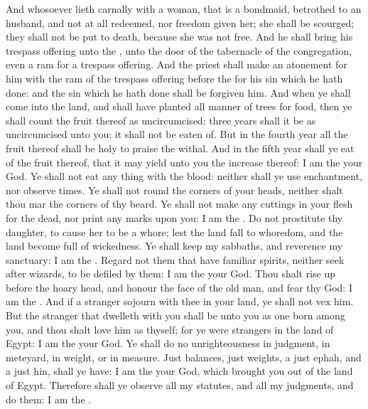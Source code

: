 \begin{biblechapter}
\verse And whosoever lieth carnally with a woman, that is a bondmaid, betrothed to an husband, and not at all redeemed, nor freedom given her; she shall be scourged; they shall not be put to death, because she was not free.
\verse And he shall bring his trespass offering unto the \LORD, unto the door of the tabernacle of the congregation, even a ram for a trespass offering.
\verse And the priest shall make an atonement for him with the ram of the trespass offering before the \LORD for his sin which he hath done: and the sin which he hath done shall be forgiven him.
\verse And when ye shall come into the land, and shall have planted all manner of trees for food, then ye shall count the fruit thereof as uncircumcised: three years shall it be as uncircumcised unto you: it shall not be eaten of.
\verse But in the fourth year all the fruit thereof shall be holy to praise the \LORD withal.
\verse And in the fifth year shall ye eat of the fruit thereof, that it may yield unto you the increase thereof: I am the \LORD your God.
\verse Ye shall not eat any thing with the blood: neither shall ye use enchantment, nor observe times.
\verse Ye shall not round the corners of your heads, neither shalt thou mar the corners of thy beard.
\verse Ye shall not make any cuttings in your flesh for the dead, nor print any marks upon you: I am the \LORD.
\verse Do not prostitute thy daughter, to cause her to be a whore; lest the land fall to whoredom, and the land become full of wickedness.
\verse Ye shall keep my sabbaths, and reverence my sanctuary: I am the \LORD.
\verse Regard not them that have familiar spirits, neither seek after wizards, to be defiled by them: I am the \LORD your God.
\verse Thou shalt rise up before the hoary head, and honour the face of the old man, and fear thy God: I am the \LORD.
\verse And if a stranger sojourn with thee in your land, ye shall not vex him.
\verse But the stranger that dwelleth with you shall be unto you as one born among you, and thou shalt love him as thyself; for ye were strangers in the land of Egypt: I am the \LORD your God.
\verse Ye shall do no unrighteousness in judgment, in meteyard, in weight, or in measure.
\verse Just balances, just weights, a just ephah, and a just hin, shall ye have: I am the \LORD your God, which brought you out of the land of Egypt.
\verse Therefore shall ye observe all my statutes, and all my judgments, and do them: I am the \LORD.
\end{biblechapter}

